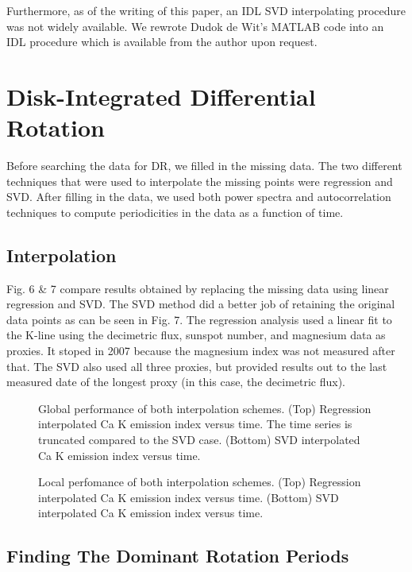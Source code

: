 \documentclass[preprint2]{aastex}
\begin{document}
Furthermore, as of the writing of this paper, an IDL SVD interpolating procedure was not widely available. We rewrote Dudok de Wit's MATLAB code into an IDL procedure which is available from the author upon request.

\section{Disk-Integrated Differential Rotation}

Before searching the data for DR, we filled in the missing data. The two different techniques that were used to interpolate the missing points were regression and SVD. After filling in the data, we used both power spectra and autocorrelation techniques to compute periodicities in the data as a function of time.

\subsection{Interpolation}

Fig. 6 \& 7 compare results obtained by replacing the missing data using linear regression and SVD. The SVD method did a better job of retaining the original data points as can be seen in Fig. 7. The regression analysis used a linear fit to the K-line using the decimetric flux, sunspot number, and magnesium data as proxies. It stoped in 2007 because the magnesium index was not measured after that. The SVD also used all three proxies, but provided results out to the last measured date of the longest proxy (in this case, the decimetric flux).

\begin{figure}[H]
\caption{Global performance of both interpolation schemes. (Top) Regression interpolated Ca K emission index versus time. The time series is truncated compared to the SVD case. (Bottom) SVD interpolated Ca K emission index versus time.}
\end{figure}

\begin{figure}[H]
\caption{Local perfomance of both interpolation schemes. (Top) Regression interpolated Ca K emission index versus time. (Bottom) SVD interpolated Ca K emission index versus time.}
\end{figure}

\subsection{Finding The Dominant Rotation Periods}
\end{document}

